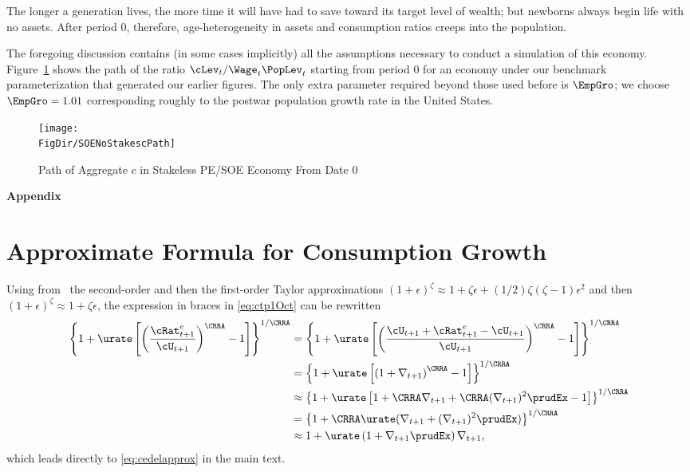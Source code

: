 \documentclass{\handout}
\begin{document}
The longer a generation lives, the more time it will have had to save toward
its target level of wealth; but newborns always begin life with no assets.  After period 0, therefore, age-heterogeneity in assets and consumption ratios creeps into the population.

The foregoing discussion contains (in some cases implicitly) all the
assumptions necessary to conduct a simulation of this economy.
Figure~\ref{fig:SOENoStakescPath} shows the path of the ratio $\cLev_{t}/\Wage_{t}\PopLev_{t}$ starting from
period 0 for an economy under our benchmark parameterization that generated
our earlier figures.  The
only extra parameter required beyond those used before is $\EmpGro$; we choose $\EmpGro=1.01$ corresponding
roughly to the postwar population growth rate in the United States.

\begin{figure}
\caption{Path of Aggregate $c$ in Stakeless PE/SOE Economy From Date 0}
\texttt{[image: \\FigDir/SOENoStakescPath]}
\label{fig:SOENoStakescPath}
\end{figure}



\label{sec:PFwhenFHWfails}
\pagebreak\appendix
\centerline\textbf{\LARGE Appendix}\medskip

\setcounter{section}{0}

\section{Approximate Formula for Consumption Growth}\label{sec:CGroApprox}

Using from \MathFactsList ~the second-order and then the first-order
Taylor approximations  \TaylorTwo $(1+\epsilon)^{\zeta} \approx 1 + \zeta \epsilon +
(1/2)\zeta(\zeta-1) \epsilon^{2}$ and then \TaylorOne $(1+\epsilon)^{\zeta} \approx 1 + \zeta \epsilon$, the expression in braces
in \eqref{eq:ctp1Oct} can be rewritten
\begin{equation}\begin{gathered}\begin{aligned}
        \left\{1+\urate\left[\left(\frac{{\cRat}^{e}_{t+1}}{\cU_{t+1}}\right)^{\CRRA}-1\right]\right\}^{1/\CRRA} & =  \left\{1+\urate\left[\left(\frac{\cU_{t+1}+{\cRat}^{e}_{t+1}-\cU_{t+1}}{\cU_{t+1}}\right)^{\CRRA}-1\right]\right\}^{1/\CRRA} \notag
\\      & =  \left\{1+\urate\left[\left(1+\nabla _{t+1}\right)^{\CRRA}-1\right]\right\}^{1/\CRRA} \notag
\\      & \approx       \left\{1+\urate\left[1+\CRRA \nabla _{t+1}+ \CRRA (\nabla _{t+1})^{2}\prudEx-1\right]\right\}^{1/\CRRA} \notag 
\\ & =          \left\{1+ \CRRA \urate (\nabla _{t+1}+ (\nabla _{t+1})^{2}\prudEx)\right\}^{1/\CRRA} \notag
\\ & \approx  1+ \urate  \left(1+\nabla _{t+1}\prudEx\right)\nabla _{t+1}, \notag
\end{aligned}\end{gathered}\end{equation}
which leads directly to \eqref{eq:cedelapprox} in the main text.
\end{document}
